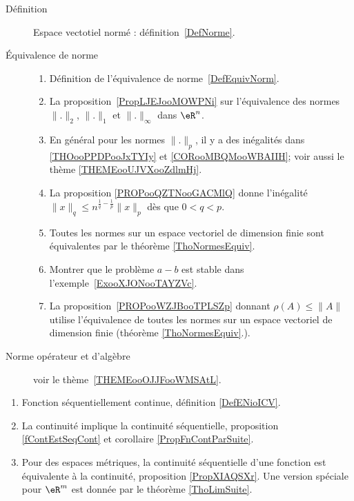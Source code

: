 \begin{description}
    \item[Définition] Espace vectotiel normé : définition~\ref{DefNorme}.
    \item[Équivalence de norme]

        \begin{enumerate}
        \item
            Définition de l'équivalence de norme~\ref{DefEquivNorm}.
\item
    La proposition~\ref{PropLJEJooMOWPNi} sur l'équivalence des normes \( \| . \|_2\), \( \| . \|_1\) et \( \| . \|_{\infty}\)  dans \( \eR^n\).
\item
     En général pour les normes \( \| . \|_p\), il y a des inégalités dans \ref{THOooPPDPooJxTYIy} et \ref{CORooMBQMooWBAIIH}; voir aussi le thème \ref{THEMEooUJVXooZdlmHj}.
 \item
     La proposition \ref{PROPooQZTNooGACMlQ} donne l'inégalité \( \| x \|_q\leq n^{\frac{1}{ q }-\frac{1}{ p }}\| x \|_p\) dès que \( 0<q<p\).
\item
    Toutes les normes sur un espace vectoriel de dimension finie sont équivalentes par le théorème \ref{ThoNormesEquiv}.
\item
    Montrer que le problème \( a-b\) est stable dans l'exemple~\ref{ExooXJONooTAYZVc}.
\item
    La proposition~\ref{PROPooWZJBooTPLSZp} donnant \( \rho(A)\leq \| A \|\) utilise l'équivalence de toutes les normes sur un espace vectoriel de dimension finie (théorème \ref{ThoNormesEquiv}.).

        \end{enumerate}

    \item[Norme opérateur et d'algèbre] voir le thème~\ref{THEMEooOJJFooWMSAtL}.

\end{description}

    \begin{enumerate}
        \item
            Fonction séquentiellement continue, définition \ref{DefENioICV}.
        \item
            La continuité implique la continuité séquentielle, proposition \ref{fContEstSeqCont} et corollaire \ref{PropFnContParSuite}.
        \item
            Pour des espaces métriques, la continuité séquentielle d'une fonction est équivalente à la continuité, proposition \ref{PropXIAQSXr}. Une version spéciale pour \( \eR^m\) est donnée par le théorème \ref{ThoLimSuite}.
    \end{enumerate}


